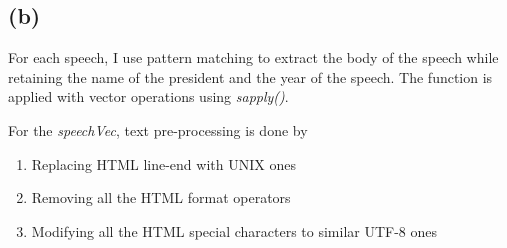 \documentclass{article}\usepackage{graphicx, color}
\begin{document}
\subsection*{(b)}

For each speech, I use pattern matching to extract the body of the speech while retaining 
the name of the president and the year of the speech. The function is applied with vector
operations using \textit{sapply()}.

For the \textit{speechVec}, text pre-processing is done by 
\begin{enumerate}
\item
Replacing HTML line-end with UNIX ones 
\item
Removing all the HTML format operators
\item
Modifying all the HTML special characters to similar UTF-8 ones
\end{enumerate}
\end{document}
